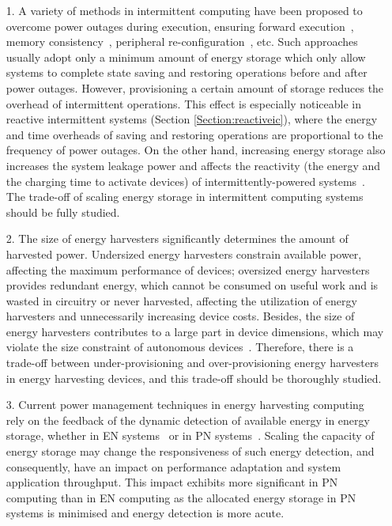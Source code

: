 \begin{itemize}
  \item [1.] A variety of methods in intermittent computing have been proposed to overcome power outages during execution, ensuring forward execution~\cite{ransford2012mementos}, memory consistency~\cite{lucia2015simpler}, peripheral re-configuration~\cite{liu2019130}, etc. Such approaches usually adopt only a minimum amount of energy storage which only allow systems to complete state saving and restoring operations before and after power outages. However, provisioning a certain amount of storage reduces the overhead of intermittent operations. This effect is especially noticeable in reactive intermittent systems (Section \ref{Section:reactiveic}), where the energy and time overheads of saving and restoring operations are proportional to the frequency of power outages. On the other hand, increasing energy storage also increases the system leakage power and affects the reactivity (the energy and the charging time to activate devices) of intermittently-powered systems~\cite{colin2018reconfigurable, wu2018extensible}. The trade-off of scaling energy storage in intermittent computing systems should be fully studied. 
  \item [2.] The size of energy harvesters significantly determines the amount of harvested power. Undersized energy harvesters constrain available power, affecting the maximum performance of devices; oversized energy harvesters provides redundant energy, which cannot be consumed on useful work and is wasted in circuitry or never harvested, affecting the utilization of energy harvesters and unnecessarily increasing device costs. Besides, the size of energy harvesters contributes to a large part in device dimensions, which may violate the size constraint of autonomous devices~\cite{buchli2014dynamic}. Therefore, there is a trade-off between under-provisioning and over-provisioning energy harvesters in energy harvesting devices, and this trade-off should be thoroughly studied. 
  \item [3.] Current power management techniques in energy harvesting computing rely on the feedback of the dynamic detection of available energy in energy storage, whether in EN systems~\cite{kansal2007power, wagemann2018operating} or in PN systems~\cite{balsamo2016graceful, fletcher2017power}. Scaling the capacity of energy storage may change the responsiveness of such energy detection, and consequently, have an impact on performance adaptation and system application throughput. This impact exhibits more significant in PN computing than in EN computing as the allocated energy storage in PN systems is minimised and energy detection is more acute. 
\end{itemize}

